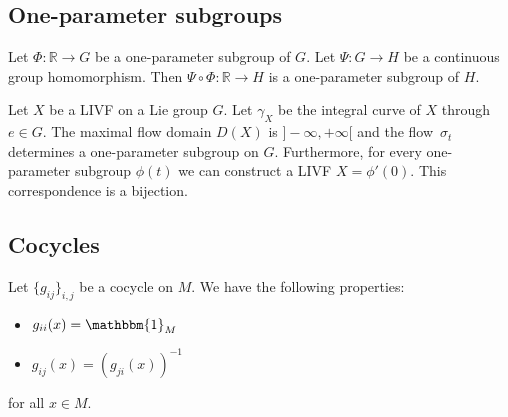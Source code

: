 \subsection{One-parameter subgroups}


        \begin{property}\label{group:OPS_composition}
        	Let $\Phi:\mathbb{R}\rightarrow G$ be a one-parameter subgroup of $G$. Let $\Psi:G\rightarrow H$ be a continuous group homomorphism. Then $\Psi\circ\Phi:\mathbb{R}\rightarrow H$ is a one-parameter subgroup of $H$.
        \end{property}
        
        \begin{property}
        	Let $X$ be a LIVF on a Lie group $G$. Let $\gamma_X$ be the integral curve of $X$ through $e\in G$. The maximal flow domain $D(X)$ is $]-\infty, +\infty[$ and the flow\footnotemark\ $\sigma_t$ determines a one-parameter subgroup on $G$. Furthermore, for every one-parameter subgroup $\phi(t)$ we can construct a LIVF $X = \phi'(0)$. This correspondence is a bijection.
        \end{property}

\subsection{Cocycles}

	\begin{property}
		Let $\{g_{ij}\}_{i,j}$ be a cocycle on $M$. We have the following properties:
		\begin{itemize}
			\item $g_{ii}(x) = \mathbbm{1}_M$
			\item $g_{ij}(x) = (g_{ji}(x))^{-1}$
		\end{itemize}
		for all $x\in M$.
	\end{property}


